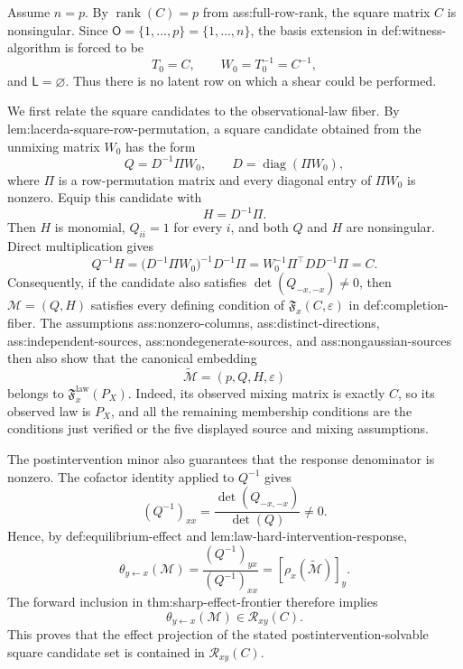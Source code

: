 Assume \(n=p\).  By \(\operatorname{rank}(C)=p\) from
\textnormal{ass:full-row-rank}, the square matrix \(C\) is nonsingular.  Since
\(\mathsf O=\{1,\ldots,p\}=\{1,\ldots,n\}\), the basis extension in
\textnormal{def:witness-algorithm} is forced to be
\[
 T_0=C,\qquad W_0=T_0^{-1}=C^{-1},
\]
and \(\mathsf L=\varnothing\).  Thus there is no latent row on which a shear
could be performed.

We first relate the square candidates to the observational-law fiber.  By
\textnormal{lem:lacerda-square-row-permutation}, a square candidate obtained
from the unmixing matrix \(W_0\) has the form
\[
 Q=D^{-1}\Pi W_0,
 \qquad
 D=\operatorname{diag}(\Pi W_0),
\]
where \(\Pi\) is a row-permutation matrix and every diagonal entry of
\(\Pi W_0\) is nonzero.  Equip this candidate with
\[
 H=D^{-1}\Pi.
\]
Then \(H\) is monomial, \(Q_{ii}=1\) for every \(i\), and both \(Q\) and
\(H\) are nonsingular.  Direct multiplication gives
\[
 Q^{-1}H
 =\bigl(D^{-1}\Pi W_0\bigr)^{-1}D^{-1}\Pi
 =W_0^{-1}\Pi^\top D D^{-1}\Pi
 =C.
\]
Consequently, if the candidate also satisfies
\(\det(Q_{-x,-x})\ne0\), then \(\mathcal M=(Q,H)\) satisfies every defining
condition of \(\mathfrak F_x(C,\varepsilon)\) in
\textnormal{def:completion-fiber}.  The assumptions
\textnormal{ass:nonzero-columns}, \textnormal{ass:distinct-directions},
\textnormal{ass:independent-sources},
\textnormal{ass:nondegenerate-sources}, and
\textnormal{ass:nongaussian-sources} then also show that the canonical
embedding
\[
 \widetilde{\mathcal M}=(p,Q,H,\varepsilon)
\]
belongs to \(\mathfrak F_x^{\mathrm{law}}(P_X)\).  Indeed, its observed
mixing matrix is exactly \(C\), so its observed law is \(P_X\), and all the
remaining membership conditions are the conditions just verified or the five
displayed source and mixing assumptions.

The postintervention minor also guarantees that the response denominator is
nonzero.  The cofactor identity applied to \(Q^{-1}\) gives
\[
 (Q^{-1})_{xx}=\frac{\det(Q_{-x,-x})}{\det(Q)}\ne0.
\]
Hence, by \textnormal{def:equilibrium-effect} and
\textnormal{lem:law-hard-intervention-response},
\[
 \theta_{y\leftarrow x}(\mathcal M)
 =\frac{(Q^{-1})_{yx}}{(Q^{-1})_{xx}}
 =[\rho_x(\widetilde{\mathcal M})]_y.
\]
The forward inclusion in \textnormal{thm:sharp-effect-frontier} therefore
implies
\[
 \theta_{y\leftarrow x}(\mathcal M)\in\mathcal R_{xy}(C).
\]
This proves that the effect projection of the stated postintervention-solvable
square candidate set is contained in \(\mathcal R_{xy}(C)\).

